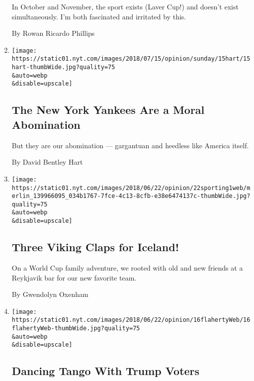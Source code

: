 \begin{enumerate}
  In October and November, the sport exists (Laver Cup!) and doesn't
  exist simultaneously. I'm both fascinated and irritated by this.

  By Rowan Ricardo Phillips
\item
  \href{/2018/07/14/opinion/new-york-yankees-evil.html}{}

  \texttt{[image: https://static01.nyt.com/images/2018/07/15/opinion/sunday/15hart/15hart-thumbWide.jpg?quality=75\\\&auto=webp\\\&disable=upscale]}

  \hypertarget{the-new-york-yankees-are-a-moral-abomination}{%
  \subsection{The New York Yankees Are a Moral
  Abomination}\label{the-new-york-yankees-are-a-moral-abomination}}

  But they are our abomination --- gargantuan and heedless like America
  itself.

  By David Bentley Hart
\item
  \href{/2018/06/22/opinion/world-cup-iceland-football.html}{}

  \texttt{[image: https://static01.nyt.com/images/2018/06/22/opinion/22sporting1web/merlin\_139966095\_034b1767-7fce-4c13-8cfb-e38e6474137c-thumbWide.jpg?quality=75\\\&auto=webp\\\&disable=upscale]}

  \hypertarget{three-viking-claps-for-iceland}{%
  \subsection{Three Viking Claps for
  Iceland!}\label{three-viking-claps-for-iceland}}

  On a World Cup family adventure, we rooted with old and new friends at
  a Reykjavik bar for our new favorite team.

  By Gwendolyn Oxenham
\item
  \href{/2018/06/17/opinion/dancing-tango-with-trump-voters.html}{}

  \texttt{[image: https://static01.nyt.com/images/2018/06/22/opinion/16flahertyWeb/16flahertyWeb-thumbWide.jpg?quality=75\\\&auto=webp\\\&disable=upscale]}

  \hypertarget{dancing-tango-with-trump-voters}{%
  \subsection{Dancing Tango With Trump
  Voters}\label{dancing-tango-with-trump-voters}}


\end{enumerate}
